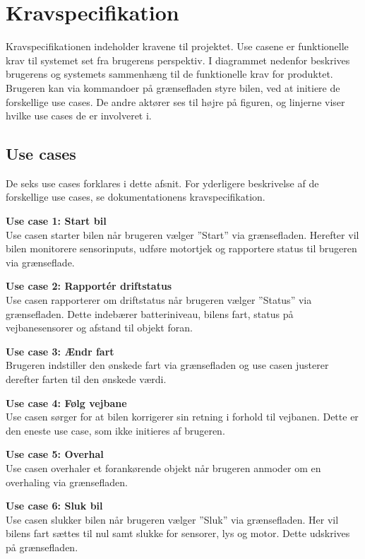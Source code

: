 \section{Kravspecifikation}
Kravspecifikationen indeholder kravene til projektet. Use casene er funktionelle krav til systemet set fra brugerens perspektiv.  
I diagrammet nedenfor beskrives brugerens og systemets sammenhæng til de funktionelle krav for produktet. 
Brugeren kan via kommandoer på grænsefladen styre bilen, ved at initiere de forskellige use cases. De andre aktører ses til højre på figuren, og linjerne viser hvilke use cases de er involveret i. 

\subsection{Use cases}
De seks use cases forklares i dette afsnit. For yderligere beskrivelse af de forskellige use cases, se dokumentationens kravspecifikation. 

\noindent\textbf{Use case 1: Start bil}
\\Use casen starter bilen når brugeren vælger ''Start'' via grænsefladen. Herefter vil bilen monitorere sensorinputs, udføre motortjek og rapportere status til brugeren via grænseflade.

\noindent\textbf{Use case 2: Rapportér driftstatus}
\\Use casen rapporterer om driftstatus når brugeren vælger ''Status'' via grænsefladen. Dette indebærer batteriniveau, bilens fart, status på vejbanesensorer og afstand til objekt foran. 

\noindent\textbf{Use case 3: Ændr fart}
\\Brugeren indstiller den ønskede fart via grænsefladen og use casen justerer derefter farten til den ønskede værdi.

\noindent\textbf{Use case 4: Følg vejbane}
\\Use casen sørger for at bilen korrigerer sin retning i forhold til vejbanen. Dette er den eneste use case, som ikke initieres af brugeren. 

\noindent\textbf{Use case 5: Overhal}
\\Use casen overhaler et forankørende objekt når brugeren anmoder om en overhaling via grænsefladen.

\noindent\textbf{Use case 6: Sluk bil}
\\Use casen slukker bilen når brugeren vælger ''Sluk'' via grænsefladen. Her vil bilens fart sættes til nul samt slukke for sensorer, lys og motor. Dette udskrives på grænsefladen.


